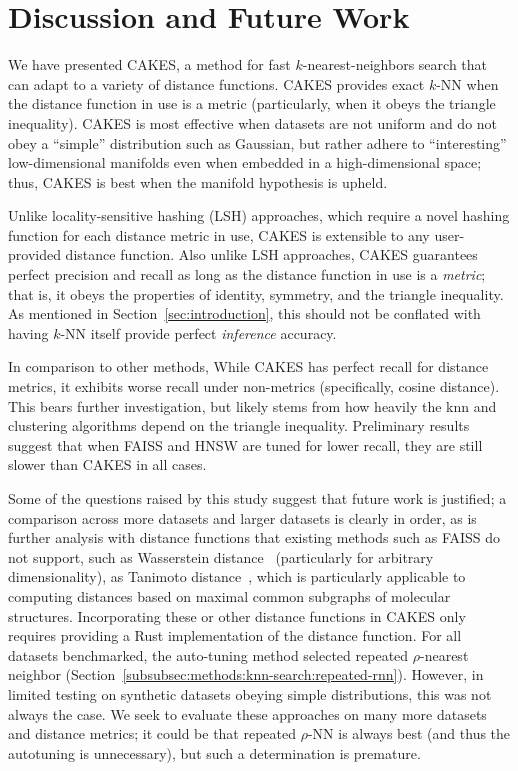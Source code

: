 \section{Discussion and Future Work}
\label{sec:discussion}

We have presented CAKES, a method for fast $k$-nearest-neighbors search that can adapt to a variety of distance functions.
CAKES provides exact $k$-NN when the distance function in use is a metric (particularly, when it obeys the triangle inequality).
CAKES is most effective when datasets are not uniform and do not obey a ``simple'' distribution such as Gaussian, but rather adhere to ``interesting'' low-dimensional manifolds even when embedded in a high-dimensional space; thus, CAKES is best when the manifold hypothesis is upheld.

Unlike locality-sensitive hashing (LSH) approaches, which require a novel hashing function for each distance metric in use, CAKES is extensible to any user-provided distance function.
Also unlike LSH approaches, CAKES guarantees perfect precision and recall as long as the distance function in use is a \emph{metric}; that is, it obeys the properties of identity, symmetry, and the triangle inequality.
As mentioned in Section~\ref{sec:introduction}, this should not be conflated with having $k$-NN itself provide perfect \emph{inference} accuracy.

In comparison to other methods, While CAKES has perfect recall for distance metrics, it exhibits worse recall under non-metrics (specifically, cosine distance). This bears further investigation, but likely stems from how heavily the knn and clustering algorithms depend on the triangle inequality.
Preliminary results suggest that when FAISS and HNSW are tuned for lower recall, they are still slower than CAKES in all cases.

Some of the questions raised by this study suggest that future work is justified; a comparison across more datasets and larger datasets is clearly in order, as is further analysis with distance functions that existing methods such as FAISS do not support, such as Wasserstein distance~\cite{vallender1974calculation} (particularly for arbitrary dimensionality), as Tanimoto distance~\cite{bajusz2015tanimoto}, which is particularly applicable to computing distances based on maximal common subgraphs of molecular structures.
Incorporating these or other distance functions in CAKES only requires providing a Rust implementation of the distance function.
For all datasets benchmarked, the auto-tuning method selected repeated $\rho$-nearest neighbor (Section~\ref{subsubsec:methods:knn-search:repeated-rnn}).
However, in limited testing on synthetic datasets obeying simple distributions, this was not always the case.
We seek to evaluate these approaches on many more datasets and distance metrics; it could be that repeated $\rho$-NN is always best (and thus the autotuning is unnecessary), but such a determination is premature.

